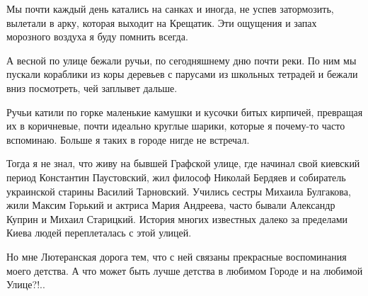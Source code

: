 Мы почти каждый день катались на санках и иногда, не успев затормозить,
вылетали в арку, которая выходит на Крещатик. Эти ощущения и запах морозного
воздуха я буду помнить всегда.

А весной по улице бежали ручьи, по сегодняшнему дню почти реки. По ним мы
пускали кораблики из коры деревьев с парусами из школьных тетрадей и бежали
вниз посмотреть, чей заплывет дальше.

Ручьи катили по горке маленькие камушки и кусочки битых кирпичей, превращая их
в коричневые, почти идеально круглые шарики, которые я почему-то часто
вспоминаю. Больше я таких в городе нигде не встречал.

Тогда я не знал, что живу на бывшей Графской улице, где начинал свой киевский
период Константин Паустовский, жил философ Николай Бердяев и собиратель
украинской старины Василий Тарновский. Учились сестры Михаила Булгакова, жили
Максим Горький и актриса Мария Андреева, часто бывали Александр Куприн и Михаил
Старицкий. История многих известных далеко за пределами Киева людей
переплеталась с этой улицей.

Но мне Лютеранская дорога тем, что с ней связаны прекрасные воспоминания моего
детства. А что может быть лучше детства в любимом Городе и на любимой Улице?!..

